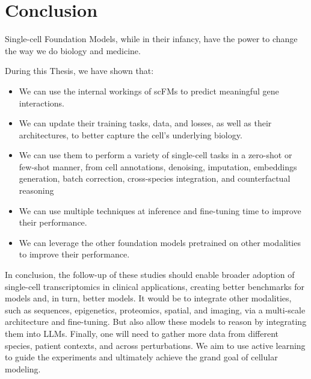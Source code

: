 \chapter*{Conclusion} %


Single-cell Foundation Models, while in their infancy, have the power to change the way we do biology and medicine.

\vspace{13pt}

During this Thesis, we have shown that:

\begin{itemize}[label=\textbullet]%
       \item We can use the internal workings of scFMs to predict meaningful gene interactions.
       \item We can update their training tasks, data, and losses, as well as their architectures, to better capture the cell's underlying biology.
       \item We can use them to perform a variety of single-cell tasks in a zero-shot or few-shot manner, from cell annotations, denoising, imputation, embeddings generation, batch correction, cross-species integration, and counterfactual reasoning
       \item We can use multiple techniques at inference and fine-tuning time to improve their performance.
       \item We can leverage the other foundation models pretrained on other modalities to improve their performance.
\end{itemize}

\vspace{13pt}

In conclusion, the follow-up of these studies should enable broader adoption of single-cell transcriptomics in clinical applications, creating better benchmarks for models and, in turn, better models. It would be to integrate other modalities, such as sequences, epigenetics, proteomics, spatial, and imaging, via a multi-scale architecture and fine-tuning. But also allow these models to reason by integrating them into LLMs. Finally, one will need to gather more data from different species, patient contexts, and across perturbations. We aim to use active learning to guide the experiments and ultimately achieve the grand goal of cellular modeling.
